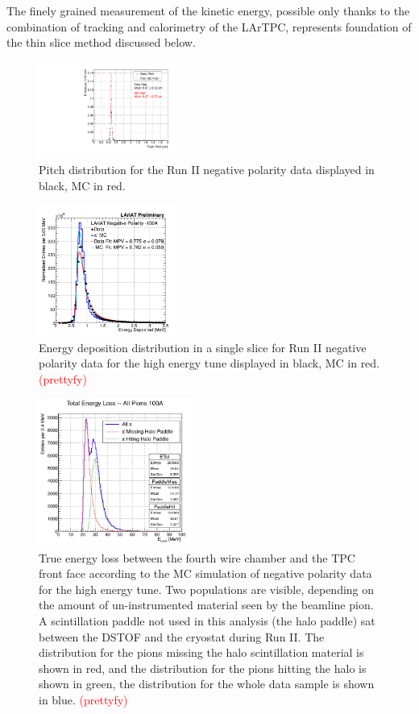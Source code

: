 \documentclass[aps,prl,twocolumn,showpacs,superscriptaddress,groupedaddress]{revtex4}  %
\begin{document}
The finely grained measurement of the kinetic energy, possible only thanks to the combination of tracking and calorimetry of the LArTPC, represents foundation of the thin slice method discussed below.\\

\begin{figure}
\includegraphics[width =0.4\textwidth ]{PitchPi}
\caption{\label{fig:pitch}  Pitch distribution for the Run II negative polarity data displayed in black, MC in red.}
\end{figure}
\begin{figure}
\includegraphics[width =0.4\textwidth ]{DepEnergy_Fit_v4100A.png}
\caption{\label{fig:enDep}  Energy deposition distribution in a single slice for Run II negative polarity data for the high energy tune displayed in black, MC in red. \textcolor{red}{(prettyfy)}}
\end{figure}

\begin{figure}
\centering
\includegraphics[width=0.45\textwidth]{E_loss100A.png}
\caption{\label{fig:ELoss100A}  True energy loss between the fourth wire chamber and the TPC front face according to the MC simulation of negative polarity data for the high energy tune. Two populations are visible, depending on the amount of un-instrumented material seen by the beamline pion. A scintillation paddle not used in this analysis (the halo paddle) sat between the DSTOF and the cryostat during Run II. The distribution for the pions missing the halo scintillation material is shown in red, and the distribution for the pions hitting the halo is shown in green, the distribution for the whole data sample is shown in blue. \textcolor{red}{(prettyfy)} }
\end{figure}
\end{document}
